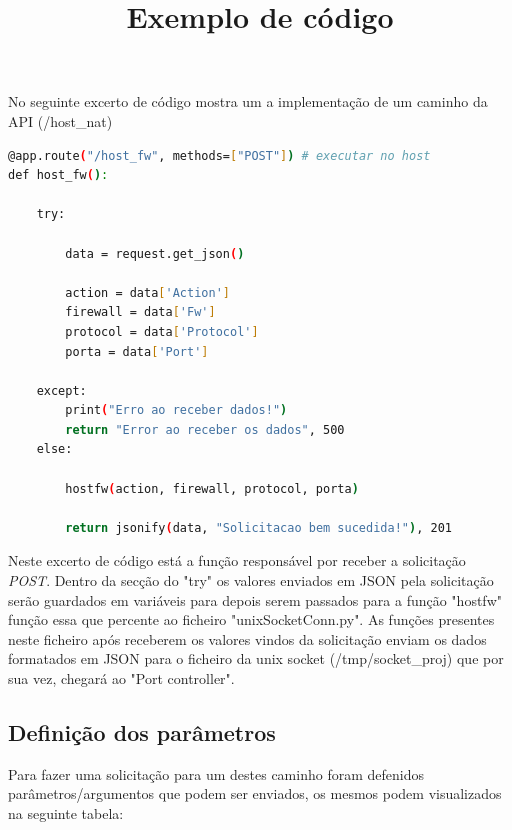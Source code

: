 \title*{\textbf{Exemplo de código}}

No seguinte excerto de código mostra um a implementação de um caminho da API (\slash host\_nat)

\begin{lstlisting}[language=Bash, caption={Definição de um caminho}]
@app.route("/host_fw", methods=["POST"]) # executar no host
def host_fw():
    
    try:

        data = request.get_json()
        
        action = data['Action']
        firewall = data['Fw']
        protocol = data['Protocol']
        porta = data['Port']

    except:
        print("Erro ao receber dados!")
        return "Error ao receber os dados", 500
    else:

        hostfw(action, firewall, protocol, porta)
        
        return jsonify(data, "Solicitacao bem sucedida!"), 201  
\end{lstlisting}

Neste excerto de código está a função responsável por receber a solicitação \textit{POST}.
Dentro da secção do "try" os valores enviados em JSON pela solicitação serão guardados em
variáveis para depois serem passados para a função "hostfw" função essa que percente ao ficheiro
"unixSocketConn.py". As funções presentes neste ficheiro após receberem os valores vindos 
da solicitação enviam os dados formatados em JSON para o ficheiro da unix socket (/tmp/socket\_proj) que por sua vez,
chegará ao "Port controller".



\subsection{Definição dos parâmetros}

Para fazer uma solicitação para um destes caminho foram defenidos parâmetros\slash argumentos
que podem ser enviados, os mesmos podem visualizados na seguinte tabela:

